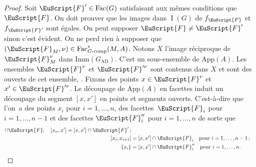 \documentclass[JEP,XML,SOM,Unicode,francais]{cedram}
\let\mathcal \EuScript
\newcommand{\AD}{\mathrm{AD}}
\newcommand{\App}{\mathrm{App}}
\newcommand{\tcomp}{\textup{-comp}}
\newcommand{\Fac}{\mathrm{Fac}}
\newcommand{\Imm}{\mathrm{Imm}}
\DeclareMathOperator{\rI}{I}
\newcommand{\cF}{\mathcal{F}}
\theoremstyle{plain}
\theoremstyle{definition}
\begin{document}
\begin{proof}
Soit $\cF'\in \Fac(G)$ satisfaisant aux mêmes conditions que $\cF$. On doit prouver que les images dans $\rI(G)$ de $f_{\cF}$ et $f_{\cF'}$ sont égales. On peut supposer $\cF\neq\cF'$ sinon c'est évident. On ne perd rien à supposer que $(\cF_{M},\nu)\in \Fac^*_{G\tcomp}(M,A)$. Notons $X$ l'image réciproque de $\cF^{\nu}_{M}$ dans $\Imm(G_{\AD})$. C'est un sous-ensemble de $\App(A)$. Les ensembles $\cF^{\nu}$ et $\cF^{\prime\nu}$ sont contenus dans $X$ et sont des ouverts de cet ensemble, \cf \cite[Lem.\,7]{W2}. Fixons des points $x\in \cF^{\nu}$ et $x'\in \cF^{\prime\nu}$. Le découpage de $\App(A)$ en facettes induit un découpage du segment $[x,x']$ en points et segments ouverts. C'est-à-dire que l'on~a des points $x_{i}$ pour $i=1,\dots,n$, des facettes~$\cF_{i}$ pour $i=1,\dots,n-1$ et des facettes $\cF''_{i}$ pour $i=1,\dots,n$ de sorte que
\begin{align*}
[x,x_{1}[{}&=[x,x']\cap \cF,\quad ]x_{n},x']=[x,x']\cap \cF'\,;\\
]x_{i},x_{i+1}[{}&=[x,x']\cap \cF_{i}\quad\text{pour }i=1,\dots,n-1\,;\\
\{x_{i}\}&=[x,x']\cap \cF''_{i}\quad\text{pour }i=1,\dots,n.
\end{align*}


\end{proof}
\end{document}
